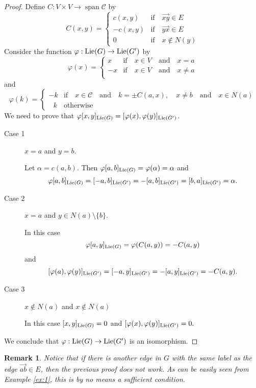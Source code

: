 \documentclass[12pt]{amsart}
\newtheorem{remark}[teo]{Remark}
\begin{document}
\begin{proof}
	
Define $C:V\times V\to \operatorname{span} \mathcal{C}$ by 
\[C(x,y)=\begin{cases} c(x,y) & \text{if}\quad \overrightarrow{xy}\in E\\
	-c(x,y) & \text{if}\quad \overrightarrow{yx}\in E\\
	0 & \text{if}\quad x\notin N(y)
\end{cases}\]
Consider the function $\varphi:{\rm Lie}(G)\to {\rm Lie}(G')$ by 
\[
\varphi(x)=\begin{cases}
	x & \mbox{if}\quad x\in V \quad \text{and}\quad x=a\\
	-x & \mbox{if}\quad x\in V \quad \text{and}\quad x\neq a\\
\end{cases}
\]
and 
\[\varphi(k)=\begin{cases}
	-k & \mbox{if}\quad x\in \mathcal{C} \quad \text{and}\quad k=\pm C(a,x), \quad x\neq b\quad \text{and}\quad x\in N(a)\\
	\,\,\,\, k & \text{otherwise}
\end{cases}\]
We need to prove that $\varphi[x,y]_{{\rm Lie}(G)}=[\varphi(x),\varphi(y)]_{{\rm Lie}(G')}$.

\begin{description}
\item[Case 1] $x=a$ and $y=b.$

\noindent Let $\alpha=c(a,b).$ Then $\varphi[a,b]_{{\rm Lie}(G)}=\varphi(\alpha)=\alpha$ and
\[\varphi[a,b]_{{\rm Lie}(G)}=[-a,b]_{{\rm Lie}(G')}=-[a,b]_{{\rm Lie}(G')}=[b,a]_{{\rm Lie}(G')}=\alpha.\]
\item[Case 2] $x=a$ and $y\in N(a)\setminus\{b\}$.

\noindent In this case
\[\varphi[a,y]_{{\rm Lie}(G)}=\varphi(C(a,y))=-C(a,y)\]
and \[[\varphi(a),\varphi(y)]_{{\rm Lie}(G')}=[-a,y]_{{\rm Lie}(G')}=-[a,y]_{{\rm Lie}(G')}=-C(a,y).\]
\item[Case 3] $x\notin N(a)$ and $x\notin N(a)$

In this case $[x,y]_{{\rm Lie}(G)}=0$ and $[\varphi(x),\varphi(y)]_{{\rm Lie}(G')}=0.$
\end{description}
We conclude that $\varphi:{\rm Lie}(G)\to {\rm Lie}(G')$ is an isomorphism.
\end{proof}

\begin{remark}
Notice that if there is another edge in $G$ with the same label as the edge $\overrightarrow{ab}\in E$, then the previous proof does not work. As can be easily seen from Example \ref{ex:1}, this is by no means a sufficient condition.
\end{remark}
\end{document}
